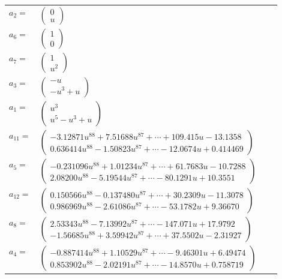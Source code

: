 \documentclass[1p]{elsarticle_modified}
\theoremstyle{definition}
\begin{document}
\begin{tabular}{m{7pt} m{180pt} m{7pt} m{180pt} }
\flushright $a_{2}=$&$\begin{pmatrix}0\\u\end{pmatrix}$ \\
\flushright $a_{6}=$&$\begin{pmatrix}1\\0\end{pmatrix}$ \\
\flushright $a_{7}=$&$\begin{pmatrix}1\\u^2\end{pmatrix}$ \\
\flushright $a_{3}=$&$\begin{pmatrix}- u\\- u^3+u\end{pmatrix}$ \\
\flushright $a_{1}=$&$\begin{pmatrix}u^3\\u^5- u^3+u\end{pmatrix}$ \\
\flushright $a_{11}=$&$\begin{pmatrix}-3.12871 u^{88}+7.51688 u^{87}+\cdots+109.415 u-13.1358\\0.636414 u^{88}-1.50823 u^{87}+\cdots-12.0674 u+0.414469\end{pmatrix}$ \\
\flushright $a_{5}=$&$\begin{pmatrix}-0.231096 u^{88}+1.01234 u^{87}+\cdots+61.7683 u-10.7288\\2.08200 u^{88}-5.19544 u^{87}+\cdots-80.1291 u+10.3551\end{pmatrix}$ \\
\flushright $a_{12}=$&$\begin{pmatrix}0.150566 u^{88}-0.137480 u^{87}+\cdots+30.2309 u-11.3078\\0.986969 u^{88}-2.61086 u^{87}+\cdots-53.1782 u+9.36670\end{pmatrix}$ \\
\flushright $a_{8}=$&$\begin{pmatrix}2.53343 u^{88}-7.13992 u^{87}+\cdots-147.071 u+17.9792\\-1.56685 u^{88}+3.59942 u^{87}+\cdots+37.5502 u-2.31927\end{pmatrix}$ \\
\flushright $a_{4}=$&$\begin{pmatrix}-0.887414 u^{88}+1.10529 u^{87}+\cdots-9.46301 u+6.49474\\0.853902 u^{88}-2.02191 u^{87}+\cdots-14.8570 u+0.758719\end{pmatrix}$ \\

\end{tabular}
\end{document}
